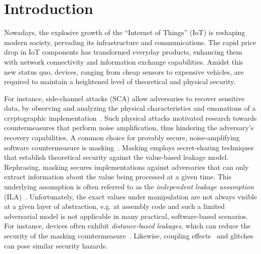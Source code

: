 \section{Introduction}
Nowadays, the explosive growth of the ``Internet of Things'' (IoT) is reshaping modern society, pervading its infrastructure and communications.
The rapid price drop in IoT components has transformed everyday products, enhancing them with network connectivity and information exchange capabilities. Amidst this new status quo, devices, ranging from cheap sensors to expensive vehicles, are required to maintain a heightened level of theoretical and physical security.

For instance, side-channel attacks (SCA) allow adversaries to recover sensitive data, by observing and analyzing the
physical characteristics and emanations of a cryptographic implementation~\cite{DBLP:conf/crypto/KocherJJ99}. Such physical attacks motivated research towards countermeasures that perform noise amplification, thus hindering the adversary's recovery capabilities. A common choice for provably secure, noise-amplifying software countermeasure is masking~\cite{DBLP:conf/crypto/ChariJRR99,DBLP:conf/crypto/IshaiSW03}. Masking employs secret-sharing techniques that establish theoretical security against the value-based leakage model. Rephrasing, masking secures implementations against adversaries that can only extract information about the value being processed at a given time. This underlying assumption is often referred to as the \emph{independent leakage assumption} (ILA)~\cite{DBLP:conf/eurocrypt/RenauldSVKF11}. Unfortunately, the exact values under manipulation are not always visible at a given layer of abstraction, e.g. at assembly code and such a limited adversarial model is not applicable in many practical, software-based scenarios. For instance, devices often exhibit \emph{distance-based leakages}, which can reduce the security of the masking countermeasure~\cite{DBLP:conf/cardis/BalaschGGRS14, DBLP:journals/iacr/GrootPPSB16}. Likewise, coupling effects~\cite{DBLP:conf/eurocrypt/RenauldSVKF11} and glitches~\cite{DBLP:conf/ches/MangardS06} can pose similar security hazards.

